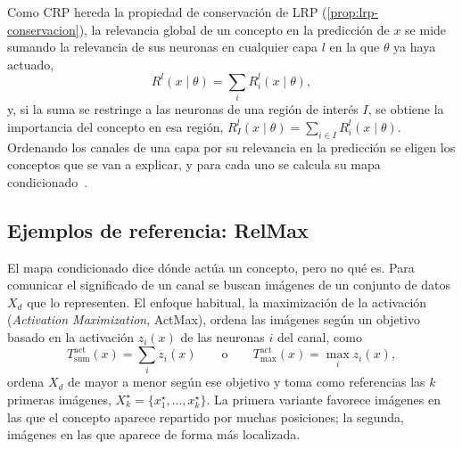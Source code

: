 Como CRP hereda la propiedad de conservación de LRP
(\cref{prop:lrp-conservacion}), la relevancia global de un concepto en la
predicción de $x$ se mide sumando la relevancia de sus neuronas en cualquier capa
$l$ en la que $\theta$ ya haya actuado,
\begin{equation}\label{eq:crp-relevancia-concepto}
  R^{l}(x \mid \theta) = \sum_{i} R^{l}_{i}(x \mid \theta),
\end{equation}
y, si la suma se restringe a las neuronas de una región de interés $I$, se obtiene
la importancia del concepto en esa región,
$R^{l}_{I}(x \mid \theta) = \sum_{i \in I} R^{l}_{i}(x \mid \theta)$.
Ordenando los canales de una capa por su relevancia en la predicción se eligen los
conceptos que se van a explicar, y para cada uno se calcula su mapa
condicionado~\cite{achtibat2023}.

\subsection{Ejemplos de referencia: RelMax}\label{sec:crp-relmax}

El mapa condicionado dice dónde actúa un concepto, pero no qué es. Para comunicar el
significado de un canal se buscan imágenes de un conjunto de datos $X_d$ que lo
representen. El enfoque habitual, la maximización de la activación (\emph{Activation
Maximization}, ActMax), ordena las imágenes según un objetivo basado en la activación
$z_i(x)$ de las neuronas $i$ del canal, como
\begin{equation}\label{eq:crp-actmax}
  T^{\mathrm{act}}_{\mathrm{sum}}(x) = \sum_{i} z_i(x)
  \qquad\text{o}\qquad
  T^{\mathrm{act}}_{\mathrm{max}}(x) = \max_{i} z_i(x),
\end{equation}
ordena $X_d$ de mayor a menor según ese objetivo y toma como referencias las $k$
primeras imágenes, $X^{\star}_{k} = \{x^{\star}_1, \dots, x^{\star}_k\}$. La primera
variante favorece imágenes en las que el concepto aparece repartido por muchas
posiciones; la segunda, imágenes en las que aparece de forma más localizada.


